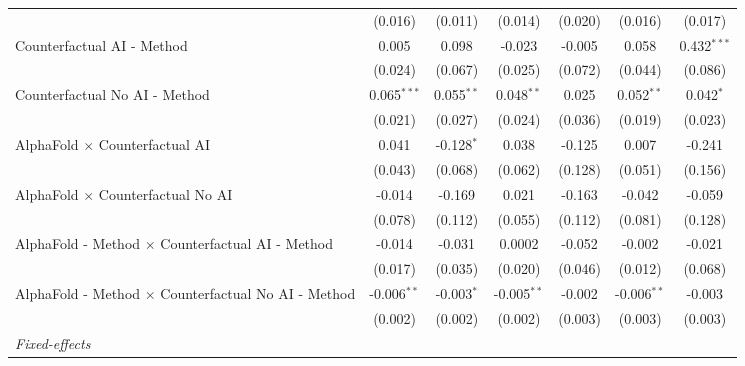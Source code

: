 \begin{tabular}{lcccccc}
                                                              & (0.016)       & (0.011)       & (0.014)       & (0.020)       & (0.016)       & (0.017)\\   
   Counterfactual AI - Method                                 & 0.005         & 0.098         & -0.023        & -0.005        & 0.058         & 0.432$^{***}$\\   
                                                              & (0.024)       & (0.067)       & (0.025)       & (0.072)       & (0.044)       & (0.086)\\   
   Counterfactual No AI - Method                              & 0.065$^{***}$ & 0.055$^{**}$  & 0.048$^{**}$  & 0.025         & 0.052$^{**}$  & 0.042$^{*}$\\   
                                                              & (0.021)       & (0.027)       & (0.024)       & (0.036)       & (0.019)       & (0.023)\\   
   AlphaFold $\times$ Counterfactual AI                       & 0.041         & -0.128$^{*}$  & 0.038         & -0.125        & 0.007         & -0.241\\   
                                                              & (0.043)       & (0.068)       & (0.062)       & (0.128)       & (0.051)       & (0.156)\\   
   AlphaFold $\times$ Counterfactual No AI                    & -0.014        & -0.169        & 0.021         & -0.163        & -0.042        & -0.059\\   
                                                              & (0.078)       & (0.112)       & (0.055)       & (0.112)       & (0.081)       & (0.128)\\   
   AlphaFold - Method $\times$ Counterfactual AI - Method     & -0.014        & -0.031        & 0.0002        & -0.052        & -0.002        & -0.021\\   
                                                              & (0.017)       & (0.035)       & (0.020)       & (0.046)       & (0.012)       & (0.068)\\   
   AlphaFold - Method $\times$ Counterfactual No AI - Method  & -0.006$^{**}$ & -0.003$^{*}$  & -0.005$^{**}$ & -0.002        & -0.006$^{**}$ & -0.003\\   
                                                              & (0.002)       & (0.002)       & (0.002)       & (0.003)       & (0.003)       & (0.003)\\   
   \midrule
   \emph{Fixed-effects}\\

\end{tabular}
